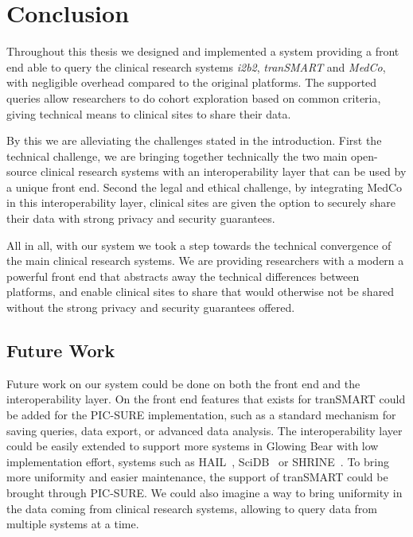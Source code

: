 \chapter{Conclusion}
\label{sec:conclusion}

Throughout this thesis we designed and implemented a system providing a front end able to query the clinical research systems \emph{i2b2}, \emph{tranSMART} and \emph{MedCo}, with negligible overhead compared to the original platforms.
The supported queries allow researchers to do cohort exploration based on common criteria, giving technical means to clinical sites to share their data.

%
By this we are alleviating the challenges stated in the introduction.
First the technical challenge, we are bringing together technically the two main open-source clinical research systems with an interoperability layer that can be used by a unique front end.
Second the legal and ethical challenge, by integrating MedCo in this interoperability layer, clinical sites are given the option to securely share their data with strong privacy and security guarantees.

All in all, with our system we took a step towards the technical convergence of the main clinical research systems.
We are providing researchers with a modern a powerful front end that abstracts away the technical differences between platforms, and enable clinical sites to share that would otherwise not be shared without the strong privacy and security guarantees offered. 



\section{Future Work}
\label{sec:futurework}

Future work on our system could be done on both the front end and the interoperability layer.
On the front end features that exists for tranSMART could be added for the PIC-SURE implementation, such as a standard mechanism for saving queries, data export, or advanced data analysis.
The interoperability layer could be easily extended to support more systems in Glowing Bear with low implementation effort, systems such as HAIL~\cite{hail}, SciDB~\cite{brown2010overview} or SHRINE~\cite{shrine}.
To bring more uniformity and easier maintenance, the support of tranSMART could be brought through PIC-SURE.
We could also imagine a way to bring uniformity in the data coming from clinical research systems, allowing to query data from multiple systems at a time.

